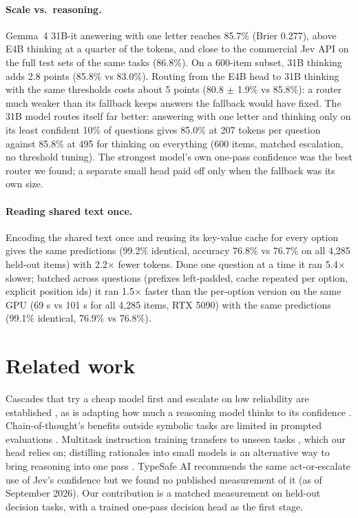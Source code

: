 \documentclass[11pt]{article}
\begin{document}
\paragraph{Scale vs.\ reasoning.} Gemma~4 31B-it answering with one letter reaches 85.7\% (Brier 0.277), above E4B
thinking at a quarter of the tokens, and close to the commercial Jev API on the full test sets of the same tasks (86.8\%). On a 600-item
subset, 31B thinking adds 2.8 points (85.8\% vs 83.0\%). Routing from the E4B head to 31B thinking with the same
thresholds costs about 5 points (80.8 $\pm$ 1.9\% vs 85.8\%): a router much weaker than its fallback keeps answers
the fallback would have fixed. The 31B model routes itself far better: answering with one letter and thinking
only on its least confident 10\% of questions gives 85.0\% at 207 tokens per question against 85.8\% at 495 for
thinking on everything (600 items, matched escalation, no threshold tuning). The strongest model's own one-pass
confidence was the best router we found; a separate small head paid off only when the fallback was its own size.

\paragraph{Reading shared text once.} Encoding the shared text once and reusing its key-value cache for every
option gives the same predictions (99.2\% identical, accuracy 76.8\% vs 76.7\% on all 4,285 held-out items) with
2.2$\times$ fewer tokens. Done one question at a time it ran 5.4$\times$ slower; batched across questions (prefixes
left-padded, cache repeated per option, explicit position ids) it ran 1.5$\times$ faster than the per-option
version on the same GPU (69 s vs 101 s for all 4,285 items, RTX 5090) with the same predictions (99.1\% identical,
76.9\% vs 76.8\%).

\section{Related work}
Cascades that try a cheap model first and escalate on low reliability are established
\citep{chen2023frugalgptuselargelanguage}, as is adapting how much a reasoning model thinks to its confidence
\citep{wang2026conformalthinkingriskcontrol}. Chain-of-thought's benefits outside symbolic tasks are
limited in prompted evaluations \citep{sprague2025cotcotchainofthoughthelps}. Multitask instruction training
transfers to unseen tasks \citep{sanh2022multitaskpromptedtrainingenables,wei2022finetunedlanguagemodelszeroshot},
which our head relies on; distilling rationales into small models is an alternative way to bring reasoning into
one pass \citep{hsieh2023distillingstepbystepoutperforminglarger}. TypeSafe AI recommends the same act-or-escalate use of Jev's confidence \citep{jev} but we found no published
measurement of it (as of September 2026). Our contribution is a matched measurement on
held-out decision tasks, with a trained one-pass decision head as the first stage.
\end{document}
